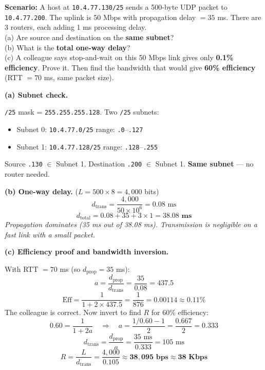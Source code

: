 \documentclass[11pt, letterpaper]{article}
\begin{document}
\begin{tcolorbox}[colback=part3bg, colframe=sectionpurple,
  title={\bfseries Problem C2 --- Full End-to-End: Subnet Check + Delay + Efficiency Inversion}, arc=3pt, boxrule=1pt]
\textbf{Scenario:} A host at \texttt{10.4.77.130/25} sends a 500-byte UDP packet to
\texttt{10.4.77.200}. The uplink is 50 Mbps with propagation delay $= 35$ ms.
There are 3 routers, each adding 1 ms processing delay.\\
(a) Are source and destination on the \textbf{same subnet}?\\
(b) What is the \textbf{total one-way delay}?\\
(c) A colleague says stop-and-wait on this 50 Mbps link gives only \textbf{0.1\% efficiency}.
Prove it. Then find the bandwidth that would give \textbf{60\% efficiency} (RTT $= 70$ ms,
same packet size).
\end{tcolorbox}

\textbf{(a) Subnet check.}

\texttt{/25} mask = \texttt{255.255.255.128}. Two \texttt{/25} subnets:
\begin{itemize}[noitemsep]
  \item Subnet 0: \texttt{10.4.77.0/25} \quad range: \texttt{.0}--\texttt{.127}
  \item Subnet 1: \texttt{10.4.77.128/25} \quad range: \texttt{.128}--\texttt{.255}
\end{itemize}
Source \texttt{.130} $\in$ Subnet 1. Destination \texttt{.200} $\in$ Subnet 1.
\textbf{Same subnet} --- no router needed.

\textbf{(b) One-way delay.} ($L = 500 \times 8 = 4{,}000$ bits)
\[d_{\text{trans}} = \frac{4{,}000}{50 \times 10^6} = 0.08 \text{ ms}\]
\[d_{\text{total}} = 0.08 + 35 + 3\times1 = \mathbf{38.08 \text{ ms}}\]
\textit{Propagation dominates (35 ms out of 38.08 ms). Transmission is negligible on a
fast link with a small packet.}

\textbf{(c) Efficiency proof and bandwidth inversion.}

With RTT $= 70$ ms (so $d_{\text{prop}} = 35$ ms):
\[a = \frac{d_{\text{prop}}}{d_{\text{trans}}} = \frac{35}{0.08} = 437.5\]
\[\text{Eff} = \frac{1}{1+2\times437.5} = \frac{1}{876} = 0.00114 \approx \mathbf{0.11\%}\]
The colleague is correct. Now invert to find $R$ for 60\% efficiency:
\[0.60 = \frac{1}{1+2a} \quad\Longrightarrow\quad a = \frac{1/0.60 - 1}{2} = \frac{0.667}{2} = 0.333\]
\[d_{\text{trans}} = \frac{d_{\text{prop}}}{a} = \frac{35 \text{ ms}}{0.333} = 105 \text{ ms}\]
\[R = \frac{L}{d_{\text{trans}}} = \frac{4{,}000}{0.105} \approx \mathbf{38{,}095 \text{ bps} \approx 38 \text{ Kbps}}\]
\end{document}

